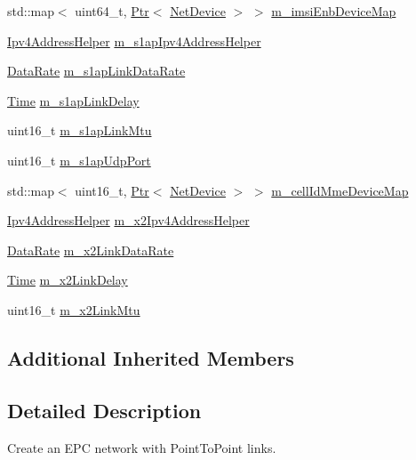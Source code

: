 \begin{DoxyCompactItemize}
\item 
std\+::map$<$ uint64\+\_\+t, \hyperlink{classns3_1_1Ptr}{Ptr}$<$ \hyperlink{classns3_1_1NetDevice}{Net\+Device} $>$ $>$ \hyperlink{classns3_1_1PointToPointEpcHelper_aee5fc5df60d9d99903e7d5c2a5473f59}{m\+\_\+imsi\+Enb\+Device\+Map}
\item 
\hyperlink{classns3_1_1Ipv4AddressHelper}{Ipv4\+Address\+Helper} \hyperlink{classns3_1_1PointToPointEpcHelper_a0c26058a4a24008dbfe7023ebc6a00af}{m\+\_\+s1ap\+Ipv4\+Address\+Helper}
\item 
\hyperlink{classns3_1_1DataRate}{Data\+Rate} \hyperlink{classns3_1_1PointToPointEpcHelper_a732626ace34876e4846d9d86b191100c}{m\+\_\+s1ap\+Link\+Data\+Rate}
\item 
\hyperlink{classns3_1_1Time}{Time} \hyperlink{classns3_1_1PointToPointEpcHelper_aa396ad3f7fa4f88cea85ffc61481afb1}{m\+\_\+s1ap\+Link\+Delay}
\item 
uint16\+\_\+t \hyperlink{classns3_1_1PointToPointEpcHelper_a1ca7acd9a9e782276d5580fd48bcda72}{m\+\_\+s1ap\+Link\+Mtu}
\item 
uint16\+\_\+t \hyperlink{classns3_1_1PointToPointEpcHelper_a54827f1909b73bb956bb6f12e098c367}{m\+\_\+s1ap\+Udp\+Port}
\item 
std\+::map$<$ uint16\+\_\+t, \hyperlink{classns3_1_1Ptr}{Ptr}$<$ \hyperlink{classns3_1_1NetDevice}{Net\+Device} $>$ $>$ \hyperlink{classns3_1_1PointToPointEpcHelper_adcf4ad1441a86ec2cddb57db3a1b0734}{m\+\_\+cell\+Id\+Mme\+Device\+Map}
\item 
\hyperlink{classns3_1_1Ipv4AddressHelper}{Ipv4\+Address\+Helper} \hyperlink{classns3_1_1PointToPointEpcHelper_a76f33ada1109b59e1c790703db453c89}{m\+\_\+x2\+Ipv4\+Address\+Helper}
\item 
\hyperlink{classns3_1_1DataRate}{Data\+Rate} \hyperlink{classns3_1_1PointToPointEpcHelper_a4f9ea604fa9ce578c054beb863f930b0}{m\+\_\+x2\+Link\+Data\+Rate}
\item 
\hyperlink{classns3_1_1Time}{Time} \hyperlink{classns3_1_1PointToPointEpcHelper_a93bb73393a99dc8f2f03a0e7e3b38fa0}{m\+\_\+x2\+Link\+Delay}
\item 
uint16\+\_\+t \hyperlink{classns3_1_1PointToPointEpcHelper_af2fe6768a3a0a75321562f01d2abff2d}{m\+\_\+x2\+Link\+Mtu}
\end{DoxyCompactItemize}
\subsection*{Additional Inherited Members}


\subsection{Detailed Description}
Create an E\+PC network with Point\+To\+Point links. 


